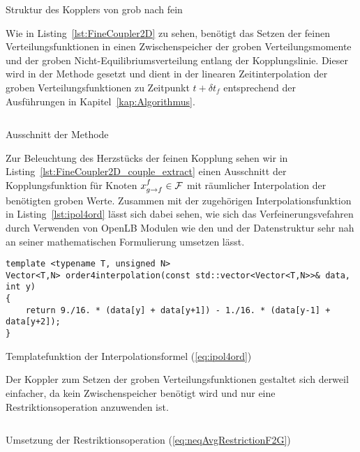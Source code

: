 \begin{listing}[H]
\inputminted{cpp}{code/fineCoupler2d.cpp}
\caption{Struktur des Kopplers von grob nach fein}
\label{lst:FineCoupler2D}
\end{listing}

Wie in Listing~\ref{lst:FineCoupler2D} zu sehen, benötigt das Setzen der feinen Verteilungsfunktionen in  einen Zwischenspeicher der groben Verteilungsmomente und der groben Nicht-Equilibriumsverteilung entlang der Kopplungslinie. Dieser wird in der Methode  gesetzt und dient in  der linearen Zeitinterpolation der groben Verteilungsfunktionen zu Zeitpunkt \(t+\delta t_f\) entsprechend der Ausführungen in Kapitel~\ref{kap:Algorithmus}.

\begin{listing}[H]
\inputminted{cpp}{code/fineCoupler2d_couple_extract.cpp}
\caption{Ausschnitt der Methode }
\label{lst:FineCoupler2D_couple_extract}
\end{listing}

Zur Beleuchtung des Herzstücks der feinen Kopplung sehen wir in Listing~\ref{lst:FineCoupler2D_couple_extract} einen Ausschnitt der Kopplungsfunktion für Knoten \(x_{g \to f}^f \in \mathcal{F}\) mit räumlicher Interpolation der benötigten groben Werte. Zusammen mit der zugehörigen Interpolationsfunktion in Listing~\ref{lst:ipol4ord} lässt sich dabei sehen, wie sich das Verfeinerungsvefahren durch Verwenden von OpenLB Modulen wie den  und der  Datenstruktur sehr nah an seiner mathematischen Formulierung umsetzen lässt.

\begin{listing}[H]
\begin{verbatim}
template <typename T, unsigned N>
Vector<T,N> order4interpolation(const std::vector<Vector<T,N>>& data, int y)
{
	return 9./16. * (data[y] + data[y+1]) - 1./16. * (data[y-1] + data[y+2]);
}
\end{verbatim}
\caption{Templatefunktion der Interpolationsformel (\ref{eq:ipol4ord})}
\label{lst:ipol4ord}
\end{listing}

Der Koppler  zum Setzen der groben Verteilungsfunktionen gestaltet sich derweil einfacher, da kein Zwischenspeicher benötigt wird und nur eine Restriktionsoperation anzuwenden ist.

\begin{listing}[H]
\inputminted{cpp}{code/computeRestrictedFneq.cpp}
\caption{Umsetzung der Restriktionsoperation (\ref{eq:neqAvgRestrictionF2G})}
\label{lst:CoarseCoupler2D_restriction}
\end{listing}

